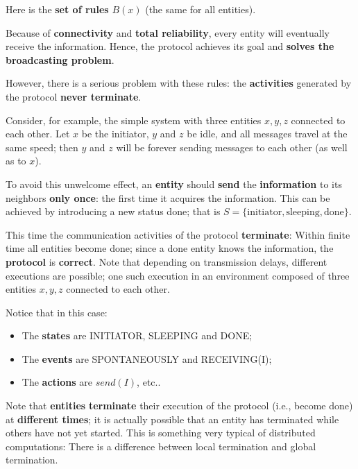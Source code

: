 Here is the \textbf{set of rules} $B(x)$ (the same for all entities).


Because of \textbf{connectivity} and \textbf{total reliability}, every entity will eventually receive the information. Hence, the protocol achieves its goal and \textbf{solves the broadcasting problem}. 

However, there is a serious problem with these rules: the \textbf{activities} generated by the protocol \textbf{never terminate}.

Consider, for example, the simple system with three entities $x, y, z$ connected to each other. Let $x$ be the initiator, $y$ and $z$ be idle, and all messages travel at the same speed; then $y$ and $z$ will be forever sending messages to each other (as well as to $x$).


To avoid this unwelcome effect, an \textbf{entity} should \textbf{send} the \textbf{information} to its neighbors \textbf{only once}: the first time it acquires the information. This can be achieved by introducing a new status done; that is $S =\{\text{initiator}, \text{sleeping}, \text{done}\}$.


This time the communication activities of the protocol \textbf{terminate}: Within finite time all entities become done; since a done entity knows the information, the \textbf{protocol} is \textbf{correct}. Note that depending on transmission delays, different executions are possible; one such execution in an environment composed of three entities $x, y, z$ connected to each other.

Notice that in this case:
\begin{itemize}
    \item The \textbf{states} are INITIATOR, SLEEPING and DONE;
    \item The \textbf{events} are SPONTANEOUSLY and RECEIVING(I);
    \item The \textbf{actions} are $send(I)$, etc..
\end{itemize}


Note that \textbf{entities} \textbf{terminate} their execution of the protocol (i.e., become done) at \textbf{different times}; it is actually possible that an entity has terminated while others have not yet started. This is something very typical of distributed computations: There is a difference between local termination and global termination.

